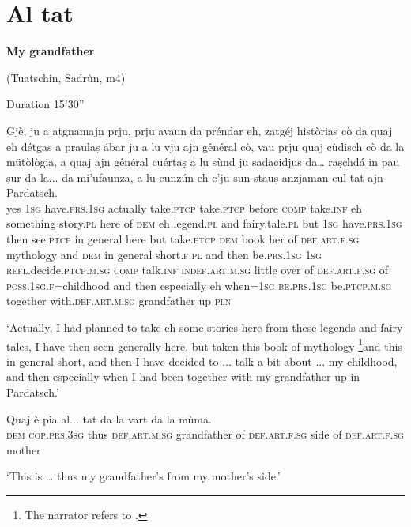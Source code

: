 \section{Al tat}


\textbf{My grandfather}

\noindent
(Tuatschin, Sadrùn, m4)

\noindent
Duration 15'30''
\bigskip

 \begin{linenumbers}
\gll Gjè, ju a atgnamajn prju, prju avaun da préndar eh, zatgéj històrias cò da quaj eh détgas a praulaṣ ábar ju a lu vju ajn gênéral cò, vau prju quaj cùdisch cò da la mütòlògia, a quaj ajn gênéral cuértaṣ a lu sùnd ju sadacidjus da… raṣchdá in pau ṣur da la... da mi’ufaunza, a lu cunzún eh c’ju sun stauṣ anzjaman cul tat ajn Pardatsch.   \\
yes \textsc{1sg} have.\textsc{prs.1sg} actually take.\textsc{ptcp} take.\textsc{ptcp} before \textsc{comp} take.\textsc{inf} eh something story.\textsc{pl} here of \textsc{dem} eh legend.\textsc{pl} and fairy.tale.\textsc{pl} but \textsc{1sg} have.\textsc{prs.1sg} then see.\textsc{ptcp} in general here but take.\textsc{ptcp}  \textsc{dem} book her of \textsc{def.art.f.sg} mythology and  \textsc{dem} in general short.\textsc{f.pl} and then  be.\textsc{prs.1sg}  \textsc{1sg}  \textsc{refl}.decide.\textsc{ptcp.m.sg}  \textsc{comp} talk.\textsc{inf}  \textsc{indef.art.m.sg} little over of  \textsc{def.art.f.sg} of  \textsc{poss.1sg.f}=childhood and then especially eh when=\textsc{1sg}  \textsc{be.prs.1sg}  be.\textsc{ptcp.m.sg} together with.\textsc{def.art.m.sg} grandfather up \textsc{pln}\\
\end{linenumbers}
\medskip
\glt `Actually, I had planned to take eh some stories here from these legends and fairy tales, I have then seen generally here, but taken this book of mythology \footnote{The narrator refers to \citet{Büchli1966}.}and this in general short, and then I have decided to ... talk a bit about ... my childhood, and then especially when I had been together with my grandfather up in Pardatsch.'
\medskip

\begin{linenumbers}
\gll  Quaj è pia al...  tat da la vart da la mùma. \\
    \textsc{dem} \textsc{cop.prs.3sg} thus \textsc{def.art.m.sg} grandfather of \textsc{def.art.f.sg} side of \textsc{def.art.f.sg} mother\\
\end{linenumbers}
\medskip
\glt `This is … thus my grandfather’s from my mother’s side.'
\medskip

